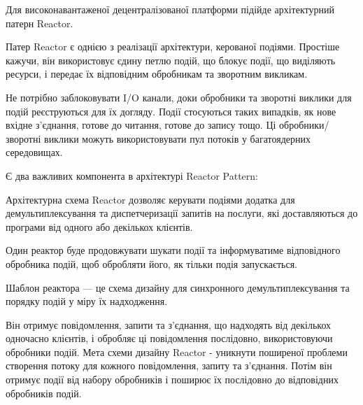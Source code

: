 \documentclass{lib/styles/default-style}
\begin{document}
    Для високонавантаженої децентралізованої платформи підійде архітектурний патерн Reactor.

    Патер Reactor є однією з реалізації архітектури, керованої подіями.
    Простіше кажучи, він використовує єдину петлю подій, що блокує події,
    що виділяють ресурси, і передає їх відповідним обробникам та зворотним викликам.

    Не потрібно заблоковувати I/O канали, доки обробники та зворотні виклики для подій реєструються для їх догляду.
    Події стосуються таких випадків, як нове вхідне з'єднання, готове до читання, готове до запису тощо.
    Ці обробники/зворотні виклики можуть використовувати пул потоків у багатоядерних середовищах.

    Є два важливих компонента в архітектурі Reactor Pattern:


    Архітектурна схема Reactor дозволяє керувати подіями додатка для демультиплексування та диспетчеризації запитів на послуги,
    які доставляються до програми від одного або декількох клієнтів.

    Один реактор буде продовжувати шукати події та інформуватиме відповідного обробника подій,
    щоб обробляти його, як тільки подія запускається.

    Шаблон реактора --- це схема дизайну для синхронного демультиплексування та порядку подій у міру їх
    надходження.

    Він отримує повідомлення, запити та з'єднання, що надходять від декількох одночасно клієнтів, і обробляє ці
    повідомлення послідовно, використовуючи обробники подій. Мета схеми дизайну Reactor -
    уникнути поширеної проблеми створення потоку для кожного повідомлення, запиту та з'єднання.
    Потім він отримує події від набору обробників і поширює їх послідовно до відповідних обробників подій.
\end{document}
